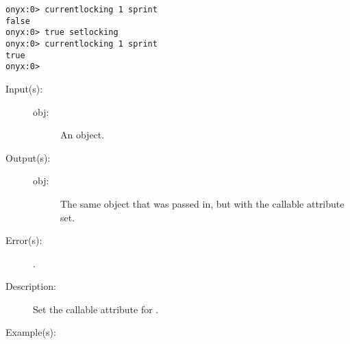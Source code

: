 \begin{description}
\begin{description}
\begin{verbatim}
onyx:0> currentlocking 1 sprint
false
onyx:0> true setlocking
onyx:0> currentlocking 1 sprint
true
onyx:0>
		\end{verbatim}
	\end{description}
\label{systemdict:cvc}
\item[{\onyxop{obj}{cvc}{obj}}: ]
	\begin{description}\item[]
	\item[Input(s): ]
		\begin{description}\item[]
		\item[obj: ]
			An object.
		\end{description}
	\item[Output(s): ]
		\begin{description}\item[]
		\item[obj: ]
			The same object that was passed in, but with the
			callable attribute set.
		\end{description}
	\item[Error(s): ]
		\begin{description}\item[]
		\item[.]
		\end{description}
	\item[Description: ]
		Set the callable attribute for .
	\item[Example(s): ]\begin{verbatim}


\end{verbatim}
\end{description}
\end{description}
